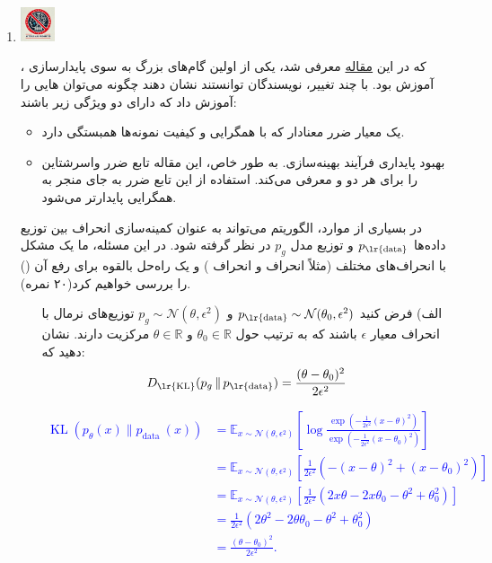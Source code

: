 \documentclass[12pt]{article}
\begin{document}
\begin{enumerate}
     
    \item \includegraphics[width=1cm]{figs/Forbidden_AI.jpg}
    
    ، که در این \href{https://arxiv.org/pdf/1701.07875}{مقاله} معرفی شد، یکی از اولین گام‌های بزرگ به سوی پایدارسازی آموزش  بود. با چند تغییر، نویسندگان توانستند نشان دهند چگونه می‌توان  هایی را آموزش داد که دارای دو ویژگی زیر باشند:
    
    \begin{itemize}
      \item یک معیار ضرر معنادار که با همگرایی  و کیفیت نمونه‌ها همبستگی دارد.
      \item بهبود پایداری فرآیند بهینه‌سازی. به طور خاص، این مقاله تابع ضرر واسرشتاین را برای هر دو  و  معرفی می‌کند. استفاده از این تابع ضرر به جای  منجر به همگرایی پایدارتر  می‌شود.
    \end{itemize}
    
    در بسیاری از موارد، الگوریتم  می‌تواند به عنوان کمینه‌سازی انحراف بین توزیع داده‌ها \( p_{\text{\lr{data}}} \) و توزیع مدل \( p_g \) در نظر گرفته شود. در این مسئله، ما یک مشکل با انحراف‌های مختلف (مثلاً انحراف  و انحراف ) و یک راه‌حل بالقوه برای رفع آن () را بررسی خواهیم کرد(۲۰ نمره).
    
    \begin{enumerate}
        \item[الف)] فرض کنید \( p_{\text{\lr{data}}} \sim \mathcal{N}(\theta_0, \epsilon^2) \) و \( p_g \sim \mathcal{N}(\theta, \epsilon^2) \) توزیع‌های نرمال با انحراف معیار \( \epsilon \) باشند که به ترتیب حول \( \theta_0 \in \mathbb{R} \) و \( \theta \in \mathbb{R} \) مرکزیت دارند. نشان دهید که:
        \[
        D_{\text{\lr{KL}}}(p_g \,\|\, p_{\text{\lr{data}}}) = \frac{(\theta - \theta_0)^2}{2\epsilon^2}
        \]

        \textcolor{blue}{
      $$
        \begin{aligned}
        \operatorname{KL}\left(p_\theta(x) \| p_{\text {data }}(x)\right) & =\mathbb{E}_{x \sim \mathcal{N}\left(\theta, \epsilon^2\right)}\left[\log \frac{\exp \left(-\frac{1}{2 \epsilon^2}(x-\theta)^2\right)}{\exp \left(-\frac{1}{2 \epsilon^2}\left(x-\theta_0\right)^2\right)}\right] \\
        & =\mathbb{E}_{x \sim \mathcal{N}\left(\theta, \epsilon^2\right)}\left[\frac{1}{2 \epsilon^2}\left(-(x-\theta)^2+\left(x-\theta_0\right)^2\right)\right] \\
        & =\mathbb{E}_{x \sim \mathcal{N}\left(\theta, \epsilon^2\right)}\left[\frac{1}{2 \epsilon^2}\left(2 x \theta-2 x \theta_0-\theta^2+\theta_0^2\right)\right] \\
        & =\frac{1}{2 \epsilon^2}\left(2 \theta^2-2 \theta \theta_0-\theta^2+\theta_0^2\right) \\
        & =\frac{\left(\theta-\theta_0\right)^2}{2 \epsilon^2} .
        \end{aligned}
    $$
      }
    

\end{enumerate}
\end{enumerate}
\end{document}

